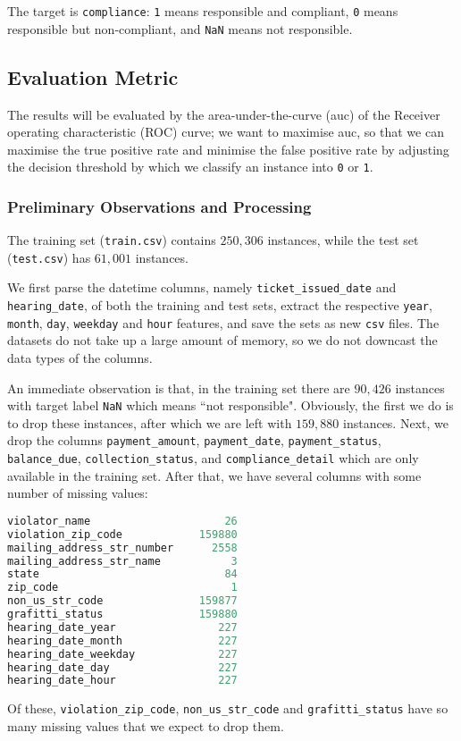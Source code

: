 \documentclass[12pt,letterpaper]{article}
\numberwithin{equation}{section}
\begin{document}
The target is \verb|compliance|: \verb|1| means responsible and compliant, \verb|0| means responsible but non-compliant, and  \verb|NaN| means not responsible.

\subsection{Evaluation Metric}

The results will be evaluated by the area-under-the-curve (auc) of the Receiver operating characteristic (ROC) curve; we want to maximise auc, so that we can maximise the true positive rate and minimise the false positive rate by adjusting the decision threshold by which we classify an instance into \verb|0| or \verb|1|.

\subsubsection*{Preliminary Observations and Processing}
The training set (\verb|train.csv|) contains $250,306$ instances, while the test set (\verb|test.csv|) has $61,001$ instances. 

We first parse the datetime columns, namely \verb|ticket_issued_date| and \verb|hearing_date|, of both the training and test sets, extract the respective \verb|year|, \verb|month|, \verb|day|, \verb|weekday| and \verb|hour| features, and save the sets as new \verb|csv| files. The datasets do not take up a large amount of memory, so we do not downcast the data types of the columns.

An immediate observation is that, in the training set there are $90,426$ instances with target label \verb|NaN| which means ``not responsible". Obviously, the first we do is to drop these instances, after which we are left with $159,880$ instances. Next, we drop the columns \verb|payment_amount|, \verb|payment_date|, \verb|payment_status|, \verb|balance_due|, \verb|collection_status|, and \verb|compliance_detail| which are only available in the training set. After that, we have several columns with some number of missing values: 
\begin{lstlisting}[language=Python, basicstyle=\footnotesize]
violator_name                     26
violation_zip_code            159880
mailing_address_str_number      2558
mailing_address_str_name           3
state                             84
zip_code                           1
non_us_str_code               159877
grafitti_status               159880
hearing_date_year                227
hearing_date_month               227
hearing_date_weekday             227
hearing_date_day                 227
hearing_date_hour                227
\end{lstlisting}
Of these, \verb|violation_zip_code|, \verb|non_us_str_code| and \verb|grafitti_status| have so many missing values that we expect to drop them.
\end{document}
